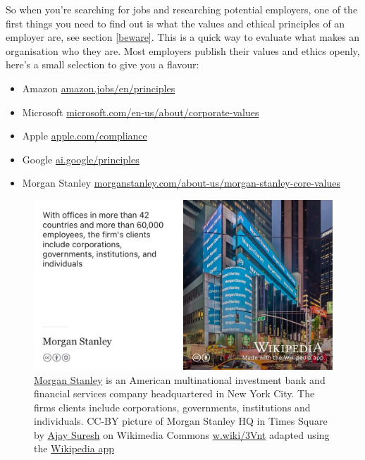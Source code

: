 \documentclass[
]{book}
\providecommand{\tightlist}{%
  \setlength{\itemsep}{0pt}\setlength{\parskip}{0pt}}
\begin{document}
So when you're searching for jobs and researching potential employers, one of the first things you need to find out is what the values and ethical principles of an employer are, see section \ref{beware}. This is a quick way to evaluate what makes an organisation who they are. Most employers publish their values and ethics openly, here's a small selection to give you a flavour:

\begin{itemize}
\tightlist
\item
  Amazon \href{https://www.amazon.jobs/en/principles}{amazon.jobs/en/principles}
\item
  Microsoft \href{https://www.microsoft.com/en-us/about/corporate-values}{microsoft.com/en-us/about/corporate-values}
\item
  Apple \href{https://www.apple.com/compliance/}{apple.com/compliance}
\item
  Google \href{https://ai.google/principles/}{ai.google/principles}
\item
  Morgan Stanley \href{https://www.morganstanley.com/about-us/morgan-stanley-core-values}{morganstanley.com/about-us/morgan-stanley-core-values}
\end{itemize}

\begin{figure}

{\centering \includegraphics[width=1\linewidth]{images/morgan-stanley-times-square} 

}

\caption{\href{https://en.wikipedia.org/wiki/Morgan_Stanley}{Morgan Stanley} is an American multinational investment bank and financial services company headquartered in New York City. The firms clients include corporations, governments, institutions and individuals. CC-BY picture of Morgan Stanley HQ in Times Square by \href{https://flickr.com/photos/ajay_suresh/}{Ajay Suresh} on Wikimedia Commons \href{https://w.wiki/3Vnt}{w.wiki/3Vnt} adapted using the \href{https://apps.apple.com/gb/app/wikipedia/id324715238}{Wikipedia app}}\label{fig:morgan-stanley-fig}
\end{figure}
\end{document}
